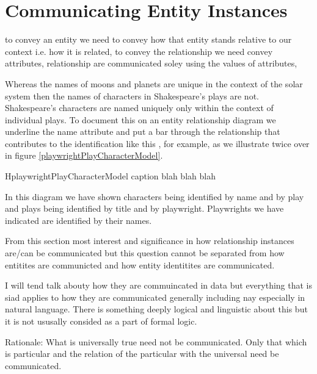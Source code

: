 \section{Communicating Entity Instances}
\label{CommunicatingEntityInstances}


\mynote to convey an entity we need to convey how that entity stands relative to our context i.e. how it is related,
to convey the relationship we need convey attributes,
 relationship are communicated soley using the values of attributes,

\mynote
Whereas the names of moons and planets are unique in the context of the solar system then the names of characters in Shakespeare's plays are not. Shakespeare's characters are named uniquely only within the context of individual plays. To document this on an entity relationship diagram we underline the name attribute and put a bar through the relationship that contributes to the identification like this \barkerEllisJ, for example, as we illustrate twice over in figure \ref{playwrightPlayCharacterModel}.


\begin{erboxedFigure} {H}{playwrightPlayCharacterModel}
{
caption blah blah blah
 }

\end{erboxedFigure}

In this diagram we have shown characters being identified by name and by play 
and plays being identified by title and by playwright. Playwrights we have indicated are identified by their names.



\mynote 
From this section most interest and significance  in how relationship instances are/can be communicated but this question cannot be separated from how entitites are communicted and how entity identitites are communicated.

\mynote I will tend talk abouty how they are commuincated in data but everything that is siad applies to how they are communicated generally including nay especially in natural language. There is something deeply logical and linguistic about this but it is not ususally consided as a part of formal logic.

\mynote Rationale: What is universally true need not be communicated. Only that which is particular and the relation of the particular with the universal need be communicated. 

